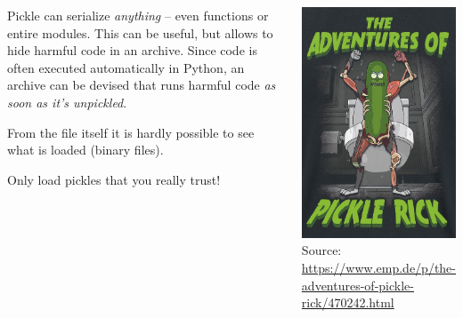 \begin{frame}
%
\begin{columns}[T]
\begin{warnbox}
Pickle can serialize \emph{anything} -- even functions or entire modules. This can be useful, but allows to hide harmful code in an archive. Since code is often executed automatically in Python, an archive can be devised that runs harmful code \emph{as soon as it's unpickled}.

\vspace{6pt}
From the file itself it is hardly possible to see what is loaded (binary files).

\vspace{6pt}
Only load pickles that you really trust!
\end{warnbox}
%
\begin{center}
\includegraphics[width=.6\linewidth]{./gfx/pickleRick}\\
\scriptsize Source: \url{https://www.emp.de/p/the-adventures-of-pickle-rick/470242.html}
\end{center}
\end{columns}
%
\end{frame}


